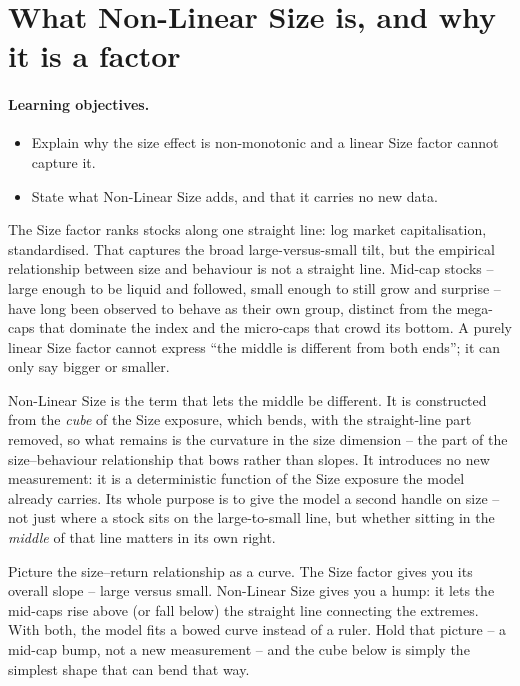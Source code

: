\documentclass[11pt]{article}
\theoremstyle{definition}
\theoremstyle{plain}
\theoremstyle{remark}
\begin{document}
\tableofcontents
\bigskip

\section{What Non-Linear Size is, and why it is a factor}\label{sec:what}

\paragraph{Learning objectives.}
\begin{itemize}[leftmargin=1.4em,topsep=2pt]
  \item Explain why the size effect is non-monotonic and a linear Size factor cannot capture it.
  \item State what Non-Linear Size adds, and that it carries no new data.
\end{itemize}

The Size factor ranks stocks along one straight line: log market capitalisation, standardised. That captures the broad large-versus-small tilt, but the empirical relationship between size and behaviour is not a straight line. Mid-cap stocks -- large enough to be liquid and followed, small enough to still grow and surprise -- have long been observed to behave as their own group, distinct from the mega-caps that dominate the index and the micro-caps that crowd its bottom. A purely linear Size factor cannot express ``the middle is different from both ends''; it can only say bigger or smaller.

Non-Linear Size is the term that lets the middle be different. It is constructed from the \emph{cube} of the Size exposure, which bends, with the straight-line part removed, so what remains is the curvature in the size dimension -- the part of the size--behaviour relationship that bows rather than slopes. It introduces no new measurement: it is a deterministic function of the Size exposure the model already carries. Its whole purpose is to give the model a second handle on size -- not just where a stock sits on the large-to-small line, but whether sitting in the \emph{middle} of that line matters in its own right.

\begin{intuition}
Picture the size--return relationship as a curve. The Size factor gives you its overall slope -- large versus small. Non-Linear Size gives you a hump: it lets the mid-caps rise above (or fall below) the straight line connecting the extremes. With both, the model fits a bowed curve instead of a ruler. Hold that picture -- a mid-cap bump, not a new measurement -- and the cube below is simply the simplest shape that can bend that way.
\end{intuition}
\end{document}
